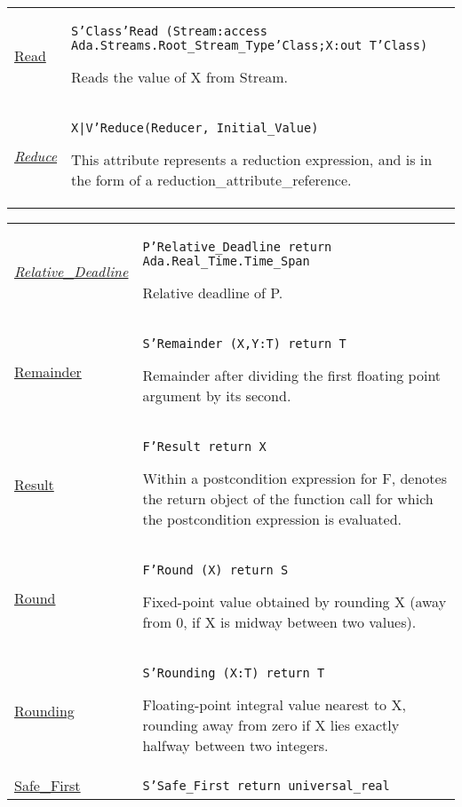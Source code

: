 \documentclass[english]{article}
\begin{document}
\begin{scriptsize}
\begin{multicols*}{3}
\begin{tabular}{@{}p{2cm}p{6.5cm}}
   \href{http://www.ada-auth.org/standards/22rm/html/RM-K-2.html}{Read} & \texttt{S'Class'Read
   (Stream:access Ada.Streams.Root\_Stream\_Type'Class;X:out T'Class)}

   Reads the value of X from Stream.\\

   \href{http://www.ada-auth.org/standards/22rm/html/RM-K-2.html}{\textit{Reduce}} & \texttt{X|V'Reduce(Reducer, Initial\_Value)}

   This attribute represents a reduction expression, and is in the form of a reduction\_attribute\_reference.\\

\end{tabular}
\begin{tabular}{@{}p{2cm}p{6.5cm}}

   \href{http://www.ada-auth.org/standards/22rm/html/RM-K-2.html}{\textit{Relative\_Deadline}} & \texttt{P'Relative\_Deadline return Ada.Real\_Time.Time\_Span}

   Relative deadline of P.\\

   \href{http://www.ada-auth.org/standards/22rm/html/RM-K-2.html}{Remainder} & \texttt{S'Remainder (X,Y:T) return T}

   Remainder after dividing the first floating point argument by its second.\\

   \href{http://www.ada-auth.org/standards/22rm/html/RM-K-2.html}{Result} & \texttt{F'Result return X}

   Within a postcondition expression for F, denotes the return object of the function call for which the postcondition expression is evaluated.\\

   \href{http://www.ada-auth.org/standards/22rm/html/RM-K-2.html}{Round} & \texttt{F'Round (X) return S}

   Fixed-point value obtained by rounding X (away from 0, if X is midway between two values).\\

   \href{http://www.ada-auth.org/standards/22rm/html/RM-K-2.html}{Rounding} & \texttt{S'Rounding (X:T) return T}

   Floating-point integral value nearest to X, rounding away from zero if X lies exactly halfway between two integers.\\

   \href{http://www.ada-auth.org/standards/22rm/html/RM-K-2.html}{Safe\_First} & \texttt{S'Safe\_First return universal\_real}


\end{tabular}
\end{multicols*}
\end{scriptsize}
\end{document}
